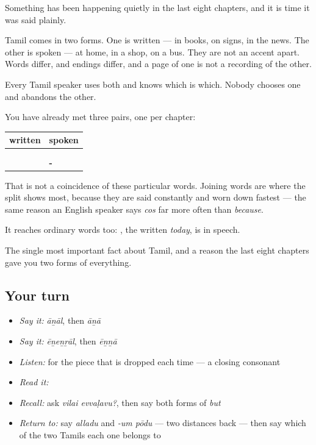 \begin{grammarlens}[title={Grammar lens: one language, two forms, and everybody uses both}]
Something has been happening quietly in the last eight chapters, and it is time it was said plainly.

Tamil comes in two forms. One is written — in books, on signs, in the news. The other is spoken — at home, in a shop, on a bus. They are not an accent apart. Words differ, and endings differ, and a page of one is not a recording of the other.

Every Tamil speaker uses both and knows which is which. Nobody chooses one and abandons the other.

You have already met three pairs, one per chapter:

\noindent
\begin{tabularx}{\linewidth}{@{}>{\raggedright\arraybackslash}X>{\raggedright\arraybackslash}X@{}}
\toprule
\textbf{written} & \textbf{spoken} \\
\midrule
\textbf{\ta{ஆனால்}} & \textbf{\ta{ஆனா}} \\
\textbf{\ta{ஏனென்றால்}} & \textbf{\ta{ஏன்னா}} \\
\textbf{\ta{என்று}} & \textbf{-\ta{ன்னு}} \\
\bottomrule
\end{tabularx}

That is not a coincidence of these particular words. Joining words are where the split shows most, because they are said constantly and worn down fastest — the same reason an English speaker says \emph{cos} far more often than \emph{because}.

It reaches ordinary words too: \textbf{}, the written \emph{today}, is \textbf{} in speech.
\end{grammarlens}

\begin{grammarlens}[title={What you've built}]
The single most important fact about Tamil, and a reason the last eight chapters gave you two forms of everything.
\end{grammarlens}

\subsection*{Your turn}
\begin{itemize}
\raggedright
  \item \emph{Say it:} \emph{āṉāl}, then \emph{āṉā}
  \item \emph{Say it:} \emph{ēṉeṉṟāl}, then \emph{ēṉṉā}
  \item \emph{Listen:} for the piece that is dropped each time — a closing consonant
  \item \emph{Read it:} \textbf{}
  \item \emph{Recall:} ask \emph{vilai evvaḷavu?}, then say both forms of \emph{but}
  \item \emph{Return to:} say \emph{alladu} and \emph{-um pōdu} — two distances back — then say which of the two Tamils each one belongs to
\end{itemize}

